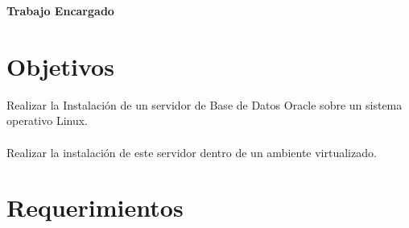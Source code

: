 
\begin{Large}
\begin{center}
\textbf{Trabajo Encargado} \\
\end{center}
\end{Large}

\section{Objetivos} 


\begin{itemize}

Realizar la Instalación de un servidor de Base de Datos
Oracle sobre un sistema operativo Linux.\\\\
Realizar la instalación de este servidor dentro de un ambiente virtualizado.\\

\end{itemize} 

\section{Requerimientos} 

